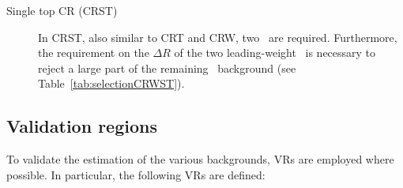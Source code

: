 \begin{description}
				\item [Single top CR (CRST)] In CRST, also similar to CRT and CRW, two \bjs\ are required. Furthermore, the requirement on the $\Delta R$ of the two leading-weight \bjs\ is necessary to reject a large part of the remaining \ttbar\ background (see Table~\ref{tab:selectionCRWST}).
			\end{description}



		\subsection{Validation regions}

			To validate the estimation of the various backgrounds, \acp{VR} are employed where possible. In particular, the following \acp{VR} are defined:


